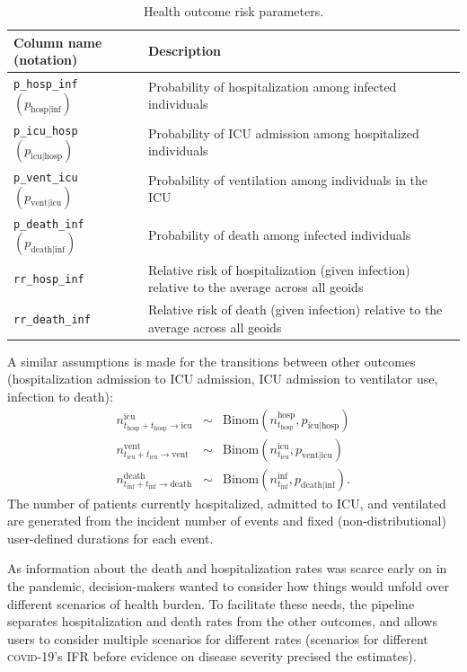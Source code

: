 {\begin{table}[t]
\label{tab:csp-outcomes}
\centering
\begin{tabular}{ll}
\toprule
 Column name (notation) & Description\\
\midrule
\verb|p_hosp_inf| $(p_{\text{hosp} \mid \text{inf}})$	& Probability of hospitalization among infected individuals\\
\verb|p_icu_hosp| $(p_{\text{icu} \mid \text{hosp}})$	&Probability of ICU admission among hospitalized individuals\\
\verb|p_vent_icu| $(p_{\text{vent} \mid \text{icu}})$ &	Probability of ventilation among individuals in the ICU\\
\verb|p_death_inf| $(p_{\text{death} \mid \text{inf}})$ &	Probability of death among infected individuals\\
\verb|rr_hosp_inf|	& Relative risk of hospitalization (given infection) relative to the average across all geoids\\
\verb|rr_death_inf| & Relative risk of death (given infection) relative to the average across all geoids\\
\bottomrule
\end{tabular}
\caption[Health outcome risk parameters]{Health outcome risk parameters.}
\end{table}

A similar assumptions is made for the transitions between other outcomes (hospitalization admission to ICU admission, ICU admission to ventilator use, infection to death):
\begin{eqnarray}
n_{t_\text{hosp} + t_\text{hosp}\to \text{icu}}^\text{icu} &\sim & \text{Binom}\left(n_{t_\text{hosp}}^\text{hosp} , p_{\text{icu}\mid \text{hosp}} \right)\\
n_{t_\text{icu} + t_\text{icu} \to \text{vent}}^\text{vent} &\sim & \text{Binom}\left(n_{t_\text{icu}}^\text{icu}, p_{\text{vent} \mid \text{icu}} \right) \\
n_{t_\text{inf} + t_\text{inf} \to \text{death}}^\text{death} &\sim & \text{Binom}\left(n_{t_\text{inf}}^\text{inf}, p_{\text{death}\mid \text{inf}}  \right).
\end{eqnarray}
The number of patients currently hospitalized, admitted to ICU, and ventilated are generated from the incident number of events and fixed (non-distributional) user-defined durations for each event.

As information about the death and hospitalization rates was scarce early on in the pandemic, decision-makers wanted to consider how things would unfold over different scenarios of health burden. To facilitate these needs, the pipeline separates hospitalization and death rates from the other outcomes, and allows users to consider multiple scenarios for different rates (\eg scenarios for different \textsc{covid}-19's IFR before evidence on disease severity precised the estimates).

}
